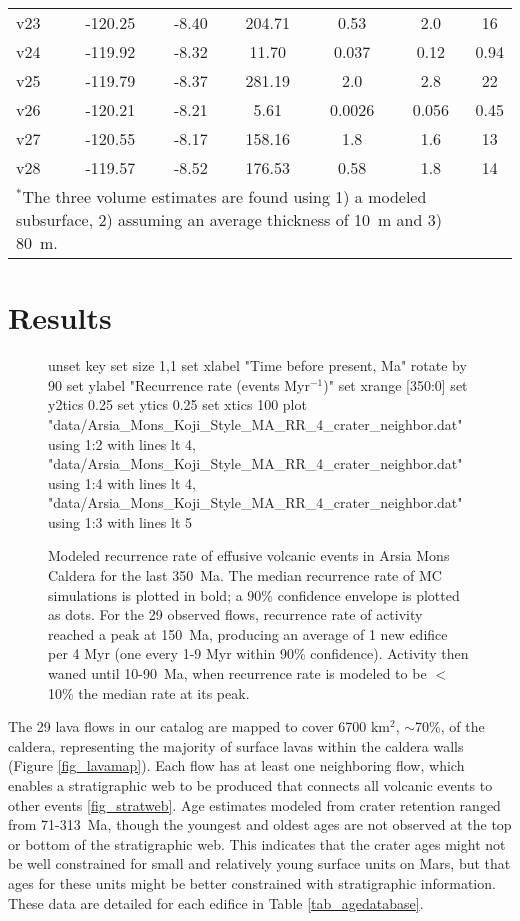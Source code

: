 \begin{table}[h!]
\begin{tabular}{l c c c c c c}
			v23 & -120.25 & -8.40 & 204.71 & 0.53 & 2.0 & 16\\
			v24 & -119.92 & -8.32 & 11.70 & 0.037 & 0.12 & 0.94\\
			v25 & -119.79 & -8.37 & 281.19 & 2.0 & 2.8 & 22\\
			v26 & -120.21 & -8.21 & 5.61 & 0.0026 & 0.056 & 0.45\\
			v27 & -120.55 & -8.17 & 158.16 & 1.8 & 1.6 & 13\\
			v28 & -119.57 & -8.52 & 176.53 & 0.58 & 1.8 & 14\\
		\bottomrule
		\multicolumn{6}{p{0.65\linewidth}}{$^*$The three volume estimates are found using 1) a modeled subsurface, 2) assuming an average thickness of 10~m and 3) 80~m.}
	\end{tabular}
	\label{tab_morphdatabase}
	\end{table}

\section{Results}

	\begin{figure}[h!]
		\centering
		\begin{gnuplot}[terminal=latex, terminaloptions=rotate]
			unset key
			set size 1,1
			set xlabel "Time before present, Ma" rotate by 90
			set ylabel "Recurrence rate (events Myr$^{-1}$)"
			set xrange [350:0]
			set y2tics 0.25
			set ytics 0.25
			set xtics 100
			plot "data/Arsia_Mons_Koji_Style_MA_RR_4_crater_neighbor.dat" using 1:2 with lines lt 4, "data/Arsia_Mons_Koji_Style_MA_RR_4_crater_neighbor.dat" using 1:4 with lines lt 4, "data/Arsia_Mons_Koji_Style_MA_RR_4_crater_neighbor.dat" using 1:3 with lines lt 5
		\end{gnuplot}
		\caption{Modeled recurrence rate of effusive volcanic events in Arsia Mons Caldera for the last 350~Ma. The median recurrence rate of MC simulations is plotted in bold; a 90\% confidence envelope is plotted as dots. For the 29 observed flows, recurrence rate of activity reached a peak at 150~Ma, producing an average of 1 new edifice per 4 Myr (one every 1-9 Myr within 90\% confidence). Activity then waned until 10-90~Ma, when recurrence rate is modeled to be $<$10\% the median rate at its peak.}
		\label{fig_VERRMRR}
	\end{figure}
	
The 29 lava flows in our catalog are mapped to cover 6700 km$^2$, $\sim$70\%, of the caldera, representing the majority of surface lavas within the caldera walls (Figure \ref{fig_lavamap}). Each flow has at least one neighboring flow, which enables a stratigraphic web to be produced that connects all volcanic events to other events \ref{fig_stratweb}. Age estimates modeled from crater retention ranged from 71-313~Ma, though the youngest and oldest ages are not observed at the top or bottom of the stratigraphic web. This indicates that the crater ages might not be well constrained for small and relatively young surface units on Mars, but that ages for these units might be better constrained with stratigraphic information. These data are detailed for each edifice in Table \ref{tab_agedatabase}.
	
